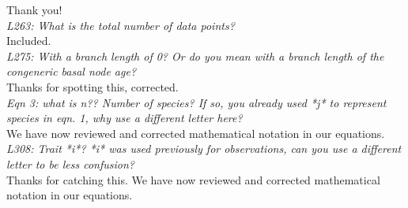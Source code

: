 \documentclass[11pt]{article}
\begin{document}
Thank you!\\ %

\emph{L263: What is the total number of data points?}\\
Included.\\ 

\emph{L275: With a branch length of 0? Or do you mean with a branch length of the congeneric basal node age?}\\
Thanks for spotting this, corrected.\\

\emph{Eqn 3: what is n?? Number of species? If so, you already used *j* to represent species in eqn. 1, why use a different letter here?}\\
We have now reviewed and corrected mathematical notation in our equations.\\


\emph{L308: Trait *i*? *i* was used previously for observations, can you use a different letter to be less confusion?}\\
Thanks for catching this. We have now reviewed and corrected mathematical notation in our equations.\\




\end{document}
